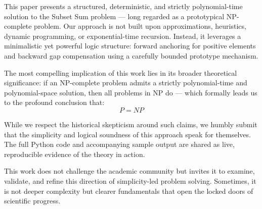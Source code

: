\documentclass[11pt]{article}
\begin{document}
This paper presents a structured, deterministic, and strictly polynomial-time solution to the Subset Sum problem — long regarded as a prototypical NP-complete problem. Our approach is not built upon approximations, heuristics, dynamic programming, or exponential-time recursion. Instead, it leverages a minimalistic yet powerful logic structure: forward anchoring for positive elements and backward gap compensation using a carefully bounded prototype mechanism.

The most compelling implication of this work lies in its broader theoretical significance: if an NP-complete problem admits a strictly polynomial-time and polynomial-space solution, then all problems in NP do — which formally leads us to the profound conclusion that:
\[
\boxed{P = NP}
\]

While we respect the historical skepticism around such claims, we humbly submit that the simplicity and logical soundness of this approach speak for themselves. The full Python code and accompanying sample output are shared as live, reproducible evidence of the theory in action.

This work does not challenge the academic community but invites it to examine, validate, and refine this direction of simplicity-led problem solving. Sometimes, it is not deeper complexity but clearer fundamentals that open the locked doors of scientific progress.

\newpage
\appendix
\end{document}
